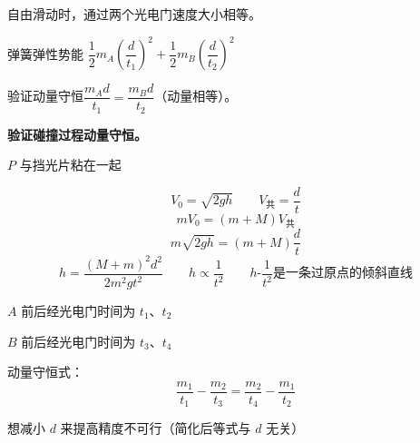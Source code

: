 
自由滑动时，通过两个光电门速度大小相等。

弹簧弹性势能 $\dfrac12m_A\left(\dfrac{d}{t_1}\right)^2+\dfrac12m_B\left(\dfrac{d}{t_2}\right)^2$

验证动量守恒\quad $\dfrac{m_Ad}{t_1}=\dfrac{m_Bd}{t_2}$（动量相等）。

\textbf{验证碰撞过程动量守恒。}


$P$ 与挡光片粘在一起

\[ V_0=\sqrt{2gh}\qquad V_{\text{共}}=\frac{d}{t} \]
\[ mV_0=(m+M)V_{\text{共}} \]
\[ m\sqrt{2gh}=(m+M)\frac{d}{t} \]
\[ h=\frac{(M+m)^2d^2}{2m^2gt^2}\qquad h\propto\frac{1}{t^2}\qquad h\text{-}\frac{1}{t^2}\text{是一条过原点的倾斜直线} \]


$A$ 前后经光电门时间为 $t_1$、$t_2$

$B$ 前后经光电门时间为 $t_3$、$t_4$

动量守恒式：
\[ \frac{m_1}{t_1}-\frac{m_2}{t_3}=\frac{m_2}{t_4}-\frac{m_1}{t_2} \]

想减小 $d$ 来提高精度\quad 不可行\quad （简化后等式与 $d$ 无关）

